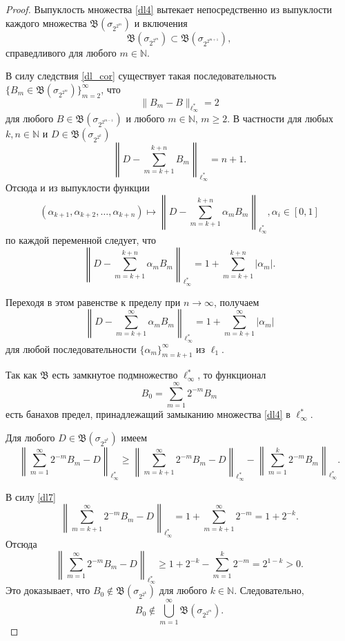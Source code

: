\documentclass[12pt]{article}
\def\N{{\mathbb{N}}}
\def\B{{\mathfrak{B}}}
\begin{document}
\begin{proof}
Выпуклость множества \eqref{dl4} вытекает непосредственно из выпуклости каждого множества $\mathfrak B(\sigma_{2^{2^m}})$ и включения
\begin{equation}\label{dl5}
\mathfrak B(\sigma_{2^{2^m}}) \subset \mathfrak B(\sigma_{2^{2^{m+1}}})
,
\end{equation}
справедливого для любого $m\in \N$.

В силу следствия \ref{dl_cor} существует такая последовательность $\{B_m \in \mathfrak B(\sigma_{2^{2^m}})\}_{m=2}^\infty$, что
\begin{equation}\label{dl6}
\|B_m-B\|_{\ell_\infty^*}=2
\end{equation}
для любого $B \in \mathfrak B(\sigma_{2^{2^{m-1}}})$ и любого $m\in \N$, $m\ge2$. В частности для любых $k,n\in\N$ и $D\in \mathfrak B(\sigma_{2^{2^k}})$
$$\left\|D-\sum_{m=k+1}^{k+n}B_m\right\|_{\ell_\infty^*}=n+1.$$
Отсюда и из выпуклости функции
$$(\alpha_{k+1}, \alpha_{k+2}, \dots, \alpha_{k+n}) \mapsto \left\|D-\sum_{m=k+1}^{k+n}\alpha_mB_m\right\|_{\ell_\infty^*}, \alpha_i \in[0,1]$$
по каждой переменной следует, что
$$\left\|D-\sum_{m=k+1}^{k+n}\alpha_mB_m\right\|_{\ell_\infty^*} = 1+ \sum_{m=k+1}^{k+n}|\alpha_m|. $$

Переходя в этом равенстве к пределу при $n\to\infty$, получаем
\begin{equation}\label{dl7}
\left\|D-\sum_{m=k+1}^\infty\alpha_mB_m\right\|_{\ell_\infty^*} = 1+ \sum_{m=k+1}^\infty|\alpha_m|
\end{equation}
для любой последовательности $\{\alpha_m\}_{m=k+1}^\infty$ из $\ell_1$.

Так как $\B$ есть замкнутое подмножество $\ell_\infty^*$, то функционал
$$B_0=\sum_{m=1}^\infty 2^{-m}B_m$$
есть банахов предел, принадлежащий замыканию множества \eqref{dl4} в $\ell_\infty^*$.

Для любого $D\in \mathfrak B(\sigma_{2^{2^k}})$ имеем
$$\left\|\sum_{m=1}^\infty 2^{-m}B_m-D\right\|_{\ell_\infty^*}\ge \left\|\sum_{m=k+1}^\infty 2^{-m}B_m-D\right\|_{\ell_\infty^*}-\left\|\sum_{m=1}^k 2^{-m}B_m\right\|_{\ell_\infty^*}.$$

В силу \eqref{dl7}
$$\left\|\sum_{m=k+1}^\infty 2^{-m}B_m-D\right\|_{\ell_\infty^*} = 1+ \sum_{m=k+1}^\infty 2^{-m}=1+2^{-k}.$$
Отсюда
$$\left\|\sum_{m=1}^\infty 2^{-m}B_m-D\right\|_{\ell_\infty^*}\ge 1+2^{-k} - \sum_{m=1}^k 2^{-m}= 2^{1-k}>0.$$
Это доказывает, что $B_0\notin \mathfrak B(\sigma_{2^{2^k}})$ для любого $k\in\N$. Следовательно,
$$B_0\notin \bigcup_{m=1}^\infty\mathfrak B(\sigma_{2^{2^m}}).$$
\end{proof}
\end{document}
